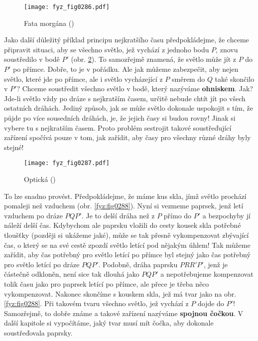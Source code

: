     \begin{figure}[ht!] %
      \centering
      \texttt{[image: fyz\_fig0286.pdf]}
      \caption{Fata morgána
               (\cite[s.~351]{Feynman01})}
      \label{fyz:fig0286}
    \end{figure}

    Jako další důležitý příklad principu nejkratšího času předpokládejme, že chceme připravit 
    situaci, aby se všechno světlo, jež vychází z jednoho bodu \(P\), znovu soustředilo v bodě 
    \(P'\) (obr. \ref{fyz:fig0287}). To samozřejmě znamená, že světlo může jít z \(P\) do \(P'\) po 
    přímce. Dobře, to je v pořádku. Ale jak můžeme zabezpečit, aby nejen světlo, které jde po 
    přímce, ale i světlo vycházející z \(P\) směrem do \(Q\) také skončilo v \(P'\)? Chceme 
    soustředit všechno světlo v bodě, který nazýváme \textbf{ohniskem}. Jak? Jde-li světlo vždy po 
    dráze s nejkratším časem, určitě nebude chtít jít po všech ostatních dráhách. Jediný způsob, 
    jak se může světlo dokonale uspokojit s tím, že půjde po více sousedních dráhách, je, že jejich 
    časy si budou rovny! Jinak si vybere tu s nejkratším časem. Proto problém sestrojit takové 
    soustřeďující zařízení spočívá pouze v tom, jak zařídit, aby časy pro všechny různé dráhy byly 
    stejné!
    
    \begin{figure}[ht!] %
      \centering
      \texttt{[image: fyz\_fig0287.pdf]}
      \caption{Optická 
               (\cite[s.~351]{Feynman01})}
      \label{fyz:fig0287}
    \end{figure}

    To lze snadno provést. Předpokládejme, že máme kus skla, jímž světlo prochází pomaleji než 
    vzduchem (obr. \ref{fyz:fig0288}). Nyní si vezmeme paprsek, jenž letí vzduchem po dráze 
    \(PQP'\). Je to delší dráha než z \(P\) přímo do \(P'\) a bezpochyby jí náleží delší čas. 
    Kdybychom ale paprsku vložili do cesty kousek skla potřebné tloušťky (později si ukážeme jaké), 
    může se tak přesně vykompenzovat zbývající čas, o který se na své cestě zpozdí světlo letící 
    pod nějakým úhlem! Tak můžeme zařídit, aby čas potřebný pro světlo letící po přímce byl stejný 
    jako čas potřebný pro světlo letící po dráze \(PQP'\). Podobně, dráha paprsku \(PRR'P'\), jenž 
    je částečně odkloněn, není sice tak dlouhá jako \(PQP'\) a nepotřebujeme kompenzovat tolik času 
    jako pro paprsek letící po přímce, ale přece je třeba něco vykompenzovat. Nakonec skončíme s 
    kouskem skla, jež má tvar jako na obr. \ref{fyz:fig0288}. Při takovém tvaru všechno světlo, jež 
    vychází z \(P\) dojde do \(P'\)! Samozřejmě, to dobře známe a takové zařízení nazýváme 
    \textbf{spojnou čočkou}. V další kapitole si vypočítáme, jaký tvar musí mít čočka, aby dokonale 
    soustřeďovala paprsky.


